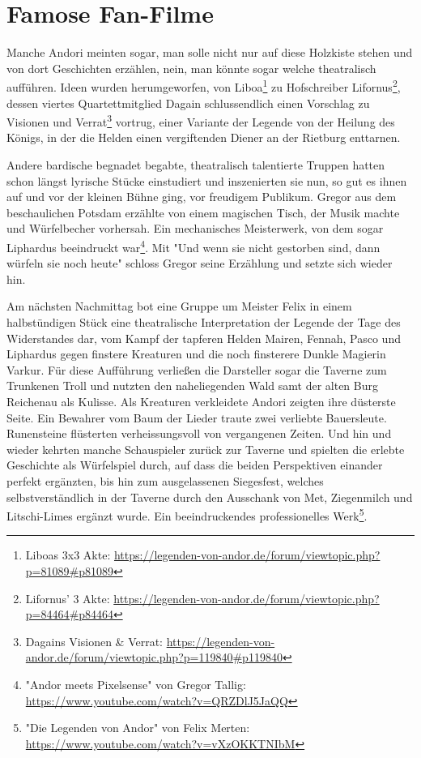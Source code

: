 \section{Famose Fan-Filme}


Manche Andori meinten sogar, man solle nicht nur auf diese Holzkiste stehen und von dort Geschichten erzählen, nein, man könnte sogar welche theatralisch aufführen. Ideen wurden herumgeworfen, von Liboa\footnote{Liboas 3x3 Akte: \url{https://legenden-von-andor.de/forum/viewtopic.php?p=81089\#p81089}} zu Hofschreiber Lifornus\footnote{Lifornus' 3 Akte: \url{https://legenden-von-andor.de/forum/viewtopic.php?p=84464\#p84464}}, dessen viertes Quartettmitglied Dagain schlussendlich einen Vorschlag zu Visionen und Verrat\footnote{Dagains Visionen \& Verrat: \url{https://legenden-von-andor.de/forum/viewtopic.php?p=119840\#p119840}} vortrug, einer Variante der Legende von der Heilung des Königs, in der die Helden einen vergiftenden Diener an der Rietburg enttarnen.

Andere bardische begnadet begabte, theatralisch talentierte Truppen hatten schon längst lyrische Stücke einstudiert und inszenierten sie nun, so gut es ihnen auf und vor der kleinen Bühne ging, vor freudigem Publikum. Gregor aus dem beschaulichen Potsdam erzählte von einem magischen Tisch, der Musik machte und Würfelbecher vorhersah. Ein mechanisches Meisterwerk, von dem sogar Liphardus beeindruckt war\footnote{"Andor meets Pixelsense" von Gregor Tallig: \url{https://www.youtube.com/watch?v=QRZDlJ5JaQQ}}.  Mit "Und wenn sie nicht gestorben sind, dann würfeln sie noch heute" schloss Gregor seine Erzählung und setzte sich wieder hin.

Am nächsten Nachmittag bot eine Gruppe um Meister Felix in einem halbstündigen Stück eine theatralische Interpretation der Legende der Tage des Widerstandes dar, vom Kampf der tapferen Helden Mairen, Fennah, Pasco und Liphardus gegen finstere Kreaturen und die noch finsterere Dunkle Magierin Varkur. Für diese Aufführung verließen die Darsteller sogar die Taverne zum Trunkenen Troll und nutzten den naheliegenden Wald samt der alten Burg Reichenau als Kulisse. Als Kreaturen verkleidete Andori zeigten ihre düsterste Seite. Ein Bewahrer vom Baum der Lieder traute zwei verliebte Bauersleute. Runensteine flüsterten verheissungsvoll von vergangenen Zeiten. Und hin und wieder kehrten manche Schauspieler zurück zur Taverne und spielten die erlebte Geschichte als Würfelspiel durch, auf dass die beiden Perspektiven einander perfekt ergänzten, bis hin zum ausgelassenen Siegesfest, welches selbstverständlich in der Taverne durch den Ausschank von Met, Ziegenmilch und Litschi-Limes ergänzt wurde. Ein beeindruckendes professionelles Werk\footnote{"Die Legenden von Andor" von Felix Merten: \url{https://www.youtube.com/watch?v=vXzOKKTNIbM}}.

